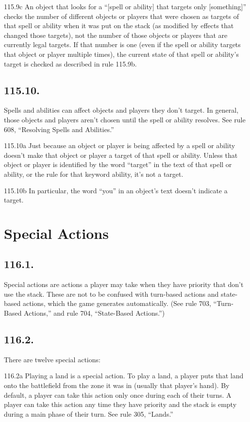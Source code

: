 115.9c An object that looks for a “[spell or ability] that targets only [something]” checks the number of different objects or players that were chosen as targets of that spell or ability when it was put on the stack (as modified by effects that changed those targets), not the number of those objects or players that are currently legal targets. If that number is one (even if the spell or ability targets that object or player multiple times), the current state of that spell or ability’s target is checked as described in rule 115.9b.

\subsection*{115.10.}
Spells and abilities can affect objects and players they don’t target. In general, those objects and players aren’t chosen until the spell or ability resolves. See rule 608, “Resolving Spells and Abilities.”

115.10a Just because an object or player is being affected by a spell or ability doesn’t make that object or player a target of that spell or ability. Unless that object or player is identified by the word “target” in the text of that spell or ability, or the rule for that keyword ability, it’s not a target.

115.10b In particular, the word “you” in an object’s text doesn’t indicate a target.

\section{Special Actions}
\subsection*{116.1.}
Special actions are actions a player may take when they have priority that don’t use the stack. These are not to be confused with turn-based actions and state-based actions, which the game generates automatically. (See rule 703, “Turn-Based Actions,” and rule 704, “State-Based Actions.”)

\subsection*{116.2.}
There are twelve special actions:

116.2a Playing a land is a special action. To play a land, a player puts that land onto the battlefield from the zone it was in (usually that player’s hand). By default, a player can take this action only once during each of their turns. A player can take this action any time they have priority and the stack is empty during a main phase of their turn. See rule 305, “Lands.”

